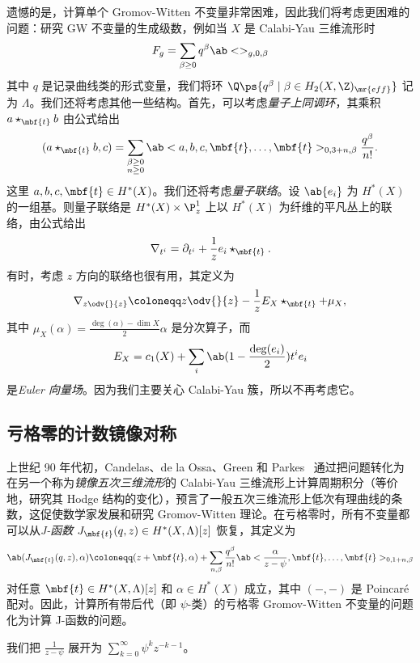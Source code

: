 遗憾的是，计算单个 Gromov-Witten 不变量非常困难，因此我们将考虑更困难的问题：研究 GW 不变量的生成级数，例如当 \(X\) 是 Calabi-Yau 三维流形时
\[ F_g = \sum_{\beta \geq 0} q^{\beta} \ab<>_{g,0,\beta} \]
其中 \(q\) 是记录曲线类的形式变量，我们将环 \(\Q\ps{q^{\beta} \mid \beta \in H_2(X, \Z)_{\mr{eff}}}\) 记为 \(\Lambda\)。我们还将考虑其他一些结构。首先，可以考虑\textit{量子上同调环}，其乘积 \(a \star_{\mbf{t}} b\) 由公式给出
\[
    (a \star_{\mbf{t}} b, c) = \sum_{\substack{\beta \geq 0 \\ n \geq 0}} \ab<a,b,c, \mbf{t}, \ldots, \mbf{t}>_{0,3+n,\beta} \frac{q^{\beta}}{n!}.
\]
这里 \(a,b,c, \mbf{t} \in H^*(X)\)。我们还将考虑\textit{量子联络}。设 \(\ab\{ e_i \}\) 为 \(H^*(X)\) 的一组基。则量子联络是 \(H^*(X) \times \P^1_z\) 上以 \(H^*(X)\) 为纤维的平凡丛上的联络，由公式给出
\[ \nabla_{t^i} = \partial_{t^i} + \frac{1}{z} e_i \star_{\mbf{t}}. \]
有时，考虑 \(z\) 方向的联络也很有用，其定义为
\[ \nabla_{z \odv{}{z}} \coloneqq z \odv{}{z} - \frac{1}{z} E_X \star_{\mbf{t}} + \mu_X, \]
其中 \(\mu_X(\alpha) = \frac{\deg(\alpha) - \dim X}{2} \alpha\) 是分次算子，而
\[ E_X = c_1(X) + \sum_i \ab(1 - \frac{\deg(e_i)}{2})t^i e_i \]
是\textit{Euler 向量场}。因为我们主要关心 Calabi-Yau 簇，所以不再考虑它。

\subsection{亏格零的计数镜像对称}%
\label{sub:Enumerative mirror symmetry in genus zero}

上世纪 90 年代初，Candelas、de la Ossa、Green 和 Parkes~\cite{CandelasEtAl1991} 通过把问题转化为在另一个称为\textit{镜像五次三维流形}的 Calabi-Yau 三维流形上计算周期积分（等价地，研究其 Hodge 结构的变化），预言了一般五次三维流形上低次有理曲线的条数，这促使数学家发展和研究 Gromov-Witten 理论。在亏格零时，所有不变量都可以从\textit{J-函数} \(J_{\mbf{t}}(q,z) \in H^*(X, \Lambda)[z]\) 恢复，其定义为
\[ \ab( J_{\mbf{t}}(q, z), \alpha ) \coloneqq (z + \mbf{t}, \alpha) + \sum_{n, \beta} \frac{q^{\beta}}{n!} \ab< \frac{\alpha}{z-\psi}, \mbf{t}, \ldots, \mbf{t}>_{0,1+n, \beta} \]
对任意 \(\mbf{t} \in H^*(X, \Lambda)[z]\) 和 \(\alpha \in H^*(X)\) 成立，其中 \((-,-)\) 是 Poincar\'e 配对。因此，计算所有带后代（即 \(\psi\)-类）的亏格零 Gromov-Witten 不变量的问题化为计算 J-函数的问题。

\begin{rmk}
    我们把 \(\frac{1}{z-\psi}\) 展开为 \(\sum_{k=0}^{\infty} \psi^k z^{-k-1}\)。
\end{rmk}

